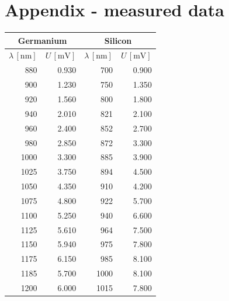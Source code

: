 \documentclass[english,11pt,a4paper]{article}
\begin{document}
		\section{Appendix - measured data}
		\begin{table}[H]
			\centering
			\begin{tabular}{rr|rr}
				\multicolumn{2}{c}{Germanium} & \multicolumn{2}{c}{Silicon}                 \\ \hline
				$\lambda \,\mathrm{[nm]}$     & $U \,\mathrm{[mV]}$     & $\lambda \,\mathrm{[nm]}$         & $U \,\mathrm{[mV]}$               \\ \hline
				880              & 0.930      & 700                  & 0.900                \\
				900              & 1.230      & 750                  & 1.350                \\
				920              & 1.560      & 800                  & 1.800                \\
				940              & 2.010      & 821                  & 2.100                \\
				960              & 2.400      & 852                  & 2.700                \\
				980              & 2.850      & 872                  & 3.300                \\
				1000             & 3.300      & 885                  & 3.900                \\
				1025             & 3.750      & 894                  & 4.500                \\
				1050             & 4.350      & 910                  & 4.200                \\
				1075             & 4.800      & 922                  & 5.700                \\
				1100             & 5.250      & 940                  & 6.600                \\
				1125             & 5.610      & 964                  & 7.500                \\
				1150             & 5.940      & 975                  & 7.800                \\
				1175             & 6.150      & 985                  & 8.100                \\
				1185             & 5.700      & 1000                 & 8.100                \\
				1200             & 6.000      & 1015                 & 7.800                \\

\end{tabular}
\end{table}
\end{document}
